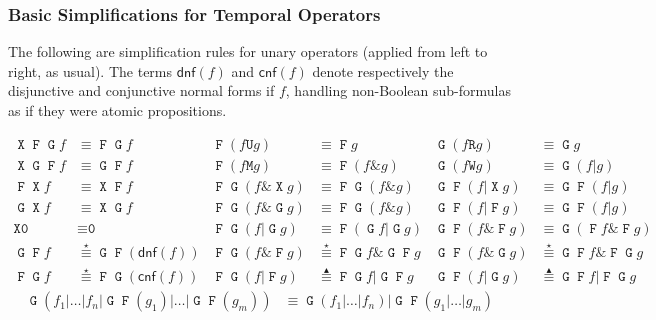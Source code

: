 \documentclass[a4paper,twoside,10pt,DIV=12]{scrreprt}
\DeclareMathOperator{\F}{\texttt{F}}
\DeclareMathOperator{\G}{\texttt{G}}
\newcommand{\U}{\mathbin{\texttt{U}}}
\newcommand{\R}{\mathbin{\texttt{R}}}
\DeclareMathOperator{\X}{\texttt{X}}
\newcommand{\M}{\mathbin{\texttt{M}}}
\newcommand{\W}{\mathbin{\texttt{W}}}
\newcommand{\OR}{\mathbin{\texttt{|}}}
\newcommand{\AND}{\mathbin{\texttt{\&}}}
\newcommand{\0}{\texttt{0}}
\newcommand{\1}{\texttt{1}}
\newcommand{\equiV}{\stackrel{\star}{\equiv}}
\newcommand{\equivEU}{\stackrel{\blacktriangleup}{\equiv}}
\begin{document}
\subsubsection{Basic Simplifications for Temporal Operators}
\label{sec:basic-simp-ltl}

The following are simplification rules for unary operators (applied
from left to right, as usual).  The terms $\mathsf{dnf}(f)$ and
$\mathsf{cnf}(f)$ denote respectively the disjunctive and conjunctive
normal forms if $f$, handling non-Boolean sub-formulas as if they were
atomic propositions.

\begin{align*}
\X\F\G f & \equiv \F\G f                & \F(f\U g)        & \equiv \F g              & \G(f \R g)      & \equiv \G g             \\
\X\G\F f & \equiv \G\F f                & \F(f\M g)        & \equiv \F (f\AND g)      & \G(f \W g)      & \equiv \G(f\OR g)       \\
\F\X f   & \equiv \X\F f                & \F\G(f\AND \X g) & \equiv \F\G(f\AND g)     & \G\F(f\OR \X g) & \equiv \G\F(f\OR g)     \\
\G\X f   & \equiv \X\G f                & \F\G(f\AND \G g) & \equiv \F\G(f\AND g)     & \G\F(f\OR \F g) & \equiv \G\F(f\OR g)     \\
\X\0     & \equiv \0                    & \F\G(f\OR\G g)   & \equiv \F(\G f\OR\G g)   & \G\F(f\AND\F g) & \equiv \G(\F f\AND\F g) \\
\G\F f   & \equiV \G\F(\mathsf{dnf}(f)) & \F\G(f\AND\F g)  & \equiV \F\G f\AND\G\F g  & \G\F(f\AND\G g) & \equiV \G\F f\AND\F\G g \\
\F\G f   & \equiV \F\G(\mathsf{cnf}(f)) & \F\G(f\OR\F g)   & \equivEU \F\G f\OR\G\F g & \G\F(f\OR\G g)  & \equivEU \G\F f\OR\F\G g
\end{align*}
\begin{align*}
  \G(f_1\OR\ldots\OR f_n \OR \G\F(g_1)\OR\ldots\OR \G\F(g_m)) & \equiv \G(f_1\OR\ldots\OR f_n)\OR \G\F(g_1\OR\ldots\OR g_m)
\end{align*}

\end{document}

